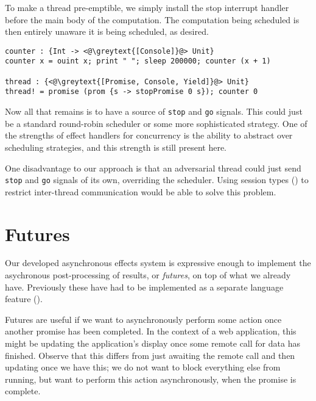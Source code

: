 \documentclass[msc,deptreport,cs]{infthesis} %
\newcommand{\code}[1]{\lstinline{#1}}
\newcommand{\greytext}[1]{\textcolor{black!40}{#1}}
\begin{document}


To make a thread pre-emptible, we simply install the stop interrupt handler
before the main body of the computation. The computation being scheduled is then
entirely unaware it is being scheduled, as desired.

\begin{lstlisting}
counter : {Int -> <@\greytext{[Console]}@> Unit}
counter x = ouint x; print " "; sleep 200000; counter (x + 1)

thread : {<@\greytext{[Promise, Console, Yield]}@> Unit}
thread! = promise (prom {s -> stopPromise 0 s}); counter 0
\end{lstlisting}

Now all that remains is to have a source of \code{stop} and \code{go} signals.
This could just be a standard round-robin scheduler or some more sophisticated
strategy. One of the strengths of effect handlers for concurrency is the ability
to abstract over scheduling strategies, and this strength is still present here.

One disadvantage to our approach is that an adversarial thread could just send
\code{stop} and \code{go} signals of its own, overriding the scheduler. Using
session types (\cite{honda1998language}) to restrict inter-thread communication
would be able to solve this problem.


\section{Futures}
\label{sec:futures}

Our developed asynchronous effects system is expressive enough to implement the
asychronous post-processing of results, or \emph{futures}, on top of what we
already have. Previously these have had to be implemented as a separate language
feature (\cite{schwinghammer2002concurrent}).

Futures are useful if we want to asynchronously perform some action once another
promise has been completed. In the context of a web application, this might be
updating the application's display once some remote call for data has finished.
Observe that this differs from just awaiting the remote call and then updating
once we have this; we do not want to block everything else from running, but
want to perform this action asynchronously, when the promise is complete.
\end{document}
